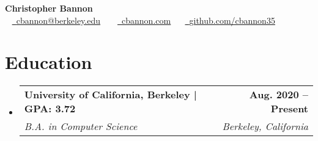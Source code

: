 \documentclass[letterpaper,11pt]{article}
\makeatletter
\newcommand{\resumeSubheading}[4]{
  \vspace{-2pt}\item
    \begin{tabular*}{1.0\textwidth}[t]{l@{\extracolsep{\fill}}r}
      \vspace{-1pt}
      \textbf{\normalsize #1} & \textbf{\small #2} \\ 
      \textit{\small#3} & \textit{\small #4} \\
    \end{tabular*}\vspace{-7pt}
}
\newcommand{\resumeSubHeadingListStart}{\begin{itemize}[leftmargin=0.0in, label={}]}
\newcommand{\resumeSubHeadingListEnd}{\end{itemize}}
\makeatother
\begin{document}


\begin{center}
    {\Huge \textbf{Christopher Bannon}} \\ \vspace{6pt}
    ~ \small \href{mailto:cbannon@berkeley.edu}{\raisebox{-0.2\height}\faEnvelope\  \underline{cbannon@berkeley.edu}} ~
    ~ \small \href{https://cbannon.com}{\raisebox{-0.2\height}\faLink\ \underline{cbannon.com}} ~
    ~\href{https://github.com/cbannon35}{\raisebox{-0.2\height}\faGithub\ \underline{github.com/cbannon35}}~
    \vspace{-8pt}
\end{center}


\section{Education}
  \resumeSubHeadingListStart
    \resumeSubheading
  {University of California, Berkeley | GPA: 3.72}{Aug. 2020 -- Present}
      {B.A. in Computer Science}{Berkeley, California}
  \resumeSubHeadingListEnd
  
\end{document}
